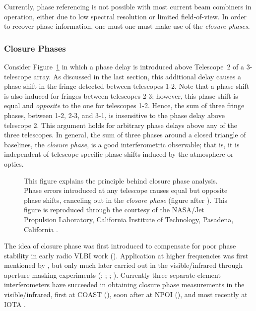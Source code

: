 \documentclass[12pt]{article}
\begin{document}
Currently, phase referencing is not possible with most current beam
combiners in operation, either due to low spectral resolution or
limited field-of-view.  In order to recover phase information, one must
one must make use of the {\em closure phases}.


\subsubsection{Closure Phases}
\label{closurephase}
Consider Figure~\ref{monnier_fig_3} in which a phase delay is
introduced above Telescope~2 of a 3-telescope array.  As discussed
in the last section, this additional
delay causes
a phase shift in the fringe detected between telescopes 1-2.
Note that a phase shift is also
induced for fringes between telescopes 2-3; however, this phase shift
is equal and {\em opposite} to the one for telescopes 1-2.  Hence, the
sum of three fringe phases, between 1-2, 2-3, and 3-1, is insensitive
to the phase delay above telescope 2.  This argument holds for
arbitrary phase delays above any of the three telescopes.  In general,
the sum of three phases around a closed triangle of baselines, the
{\em closure phase}, is a good interferometric observable; that is, it
is independent of telescope-specific phase shifts induced by the
atmosphere or optics.


\begin{figure}
\begin{center}


\centerline{}
\caption{This figure explains the principle behind closure phase analysis.
Phase errors introduced at any telescope causes equal but opposite phase
shifts, canceling out in the {\em closure phase} 
(figure after \citealt{readhead88}).  This figure is reproduced 
through the courtesy
of the NASA/Jet Propulsion Laboratory,
California Institute of Technology, Pasadena, California \citep{monnier_mss}.
\label{monnier_fig_3}}
\end{center}
\end{figure}

The idea of closure phase was first introduced to compensate for poor
phase stability in early radio VLBI work (\citealt{jennison58}).
Application at higher frequencies was first mentioned by
\cite{rogstad68}, but only much later carried out in the
visible/infrared through aperture masking experiments
(\citealt{baldwin86}; \citealt{haniff87}; \citealt{readhead88};
\citealt{haniff89}).  Currently three separate-element interferometers
have succeeded in obtaining closure phase measurements in the
visible/infrared, first at COAST (\citealt{coast96}), soon after at
NPOI (\citealt{npoi97}), and most recently at IOTA \citep{traub2002}.
\end{document}
